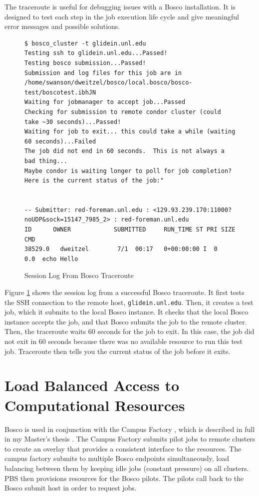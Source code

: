 The traceroute is useful for debugging issues with a Bosco installation.  It is designed to test each step in the job execution life cycle and give meaningful error messages and possible solutions.

\begin{figure}[h!t]
\begin{lstlisting}[basicstyle=\scriptsize\ttfamily]
$ bosco_cluster -t glidein.unl.edu
Testing ssh to glidein.unl.edu...Passed!
Testing bosco submission...Passed!
Submission and log files for this job are in /home/swanson/dweitzel/bosco/local.bosco/bosco-test/boscotest.ibhJN
Waiting for jobmanager to accept job...Passed
Checking for submission to remote condor cluster (could take ~30 seconds)...Passed!
Waiting for job to exit... this could take a while (waiting 60 seconds)...Failed
The job did not end in 60 seconds.  This is not always a bad thing...
Maybe condor is waiting longer to poll for job completion?
Here is the current status of the job:"


-- Submitter: red-foreman.unl.edu : <129.93.239.170:11000?noUDP&sock=15147_7985_2> : red-foreman.unl.edu
ID      OWNER            SUBMITTED     RUN_TIME ST PRI SIZE CMD               
38529.0   dweitzel        7/1  00:17   0+00:00:00 I  0   0.0  echo Hello   
\end{lstlisting}
\caption{Session Log From Bosco Traceroute}
\label{lst:boscotraceroute}
\end{figure}

Figure \ref{lst:boscotraceroute} shows the session log from a successful Bosco traceroute.  It first tests the SSH connection to the remote host, \texttt{glidein.unl.edu}.  Then, it creates a test job, which it submits to the local Bosco instance.  It checks that the local Bosco instance accepts the job, and that Bosco submits the job to the remote cluster.  Then, the traceroute waits 60 seconds for the job to exit.  In this case, the job did not exit in 60 seconds because there was no available resource to run this test job.  Traceroute then tells you the current status of the job before it exits.


\section{Load Balanced Access to Computational Resources}

Bosco is used in conjunction with the Campus Factory \cite{website:campusfactory}, which is described in full in my Master's thesis \cite{weitzel2011campus}.  The Campus Factory submits pilot jobs to remote clusters to create an overlay that provides a consistent interface to the resources.  The campus factory submits to multiple Bosco endpoints simultaneously, load balancing between them by keeping idle jobs (constant pressure) on all clusters.  PBS then provisions resources for the Bosco pilots.  The pilots call back to the Bosco submit host in order to request jobs.

